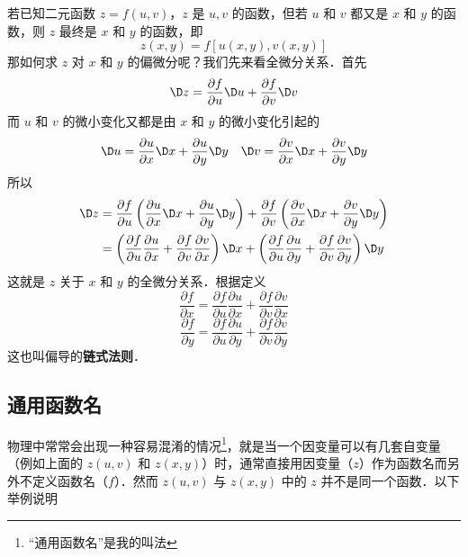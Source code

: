 

若已知二元函数 $z = f(u,v)$，$z$ 是 $u, v$ 的函数，但若 $u$ 和 $v$ 都又是 $x$ 和 $y$ 的函数，则 $z$ 最终是 $x$ 和 $y$ 的函数，即
\begin{equation}
z(x,y) = f[u(x,y),v(x,y)]
\end{equation}
那如何求 $z$ 对 $x$ 和 $y$ 的偏微分呢？我们先来看全微分关系．首先
\begin{equation}
\D z = \frac{{\partial f}}{{\partial u}}\D u + \frac{{\partial f}}{{\partial v}}\D v
\end{equation}
而 $u$ 和 $v$ 的微小变化又都是由 $x$ 和 $y$ 的微小变化引起的
\begin{equation}
\D u = \frac{{\partial u}}{{\partial x}}\D x + \frac{{\partial u}}{{\partial y}}\D y
\quad
\D v = \frac{{\partial v}}{{\partial x}}\D x + \frac{{\partial v}}{{\partial y}}\D y
\end{equation}
所以
\begin{equation}
\begin{aligned}
\D z &= \frac{{\partial f}}{{\partial u}}\left( {\frac{{\partial u}}{{\partial x}}\D x + \frac{{\partial u}}{{\partial y}}\D y} \right) + \frac{{\partial f}}{{\partial v}}\left( {\frac{{\partial v}}{{\partial x}}\D x + \frac{{\partial v}}{{\partial y}}\D y} \right) \hfill \\
   &= \left( {\frac{{\partial f}}{{\partial u}}\frac{{\partial u}}{{\partial x}} + \frac{{\partial f}}{{\partial v}}\frac{{\partial v}}{{\partial x}}} \right)\D x + \left( {\frac{{\partial f}}{{\partial u}}\frac{{\partial u}}{{\partial y}} + \frac{{\partial f}}{{\partial v}}\frac{{\partial v}}{{\partial y}}} \right) \D y
\end{aligned}
\end{equation}
这就是 $z$ 关于 $x$ 和 $y$ 的全微分关系．根据定义
\begin{equation}
\frac{{\partial f}}{{\partial x}} = \frac{{\partial f}}{{\partial u}}\frac{{\partial u}}{{\partial x}} + \frac{{\partial f}}{{\partial v}}\frac{{\partial v}}{{\partial x}}
\end{equation}
\begin{equation}
\frac{{\partial f}}{{\partial y}} = \frac{{\partial f}}{{\partial u}}\frac{{\partial u}}{{\partial y}} + \frac{{\partial f}}{{\partial v}}\frac{{\partial v}}{{\partial y}}
\end{equation}
这也叫偏导的\textbf{链式法则}．

\subsection{通用函数名}
物理中常常会出现一种容易混淆的情况\footnote{“通用函数名”是我的叫法}，就是当一个因变量可以有几套自变量（例如上面的 $z(u,v)$ 和 $z(x,y)$）时，通常直接用因变量（$z$）作为函数名而另外不定义函数名（$f$）．然而 $z(u,v)$ 与 $z(x,y)$ 中的 $z$ 并不是同一个函数．以下举例说明

